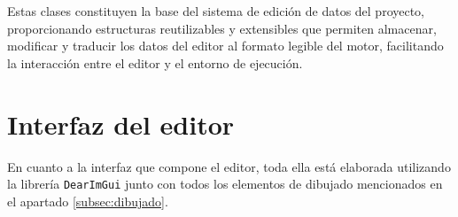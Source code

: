 Estas clases constituyen la base del sistema de edición de datos del proyecto, proporcionando estructuras reutilizables y extensibles que permiten almacenar, modificar y traducir los datos del editor al formato legible del motor, facilitando la interacción entre el editor y el entorno de ejecución.

\section{Interfaz del editor}
En cuanto a la interfaz que compone el editor, toda ella está elaborada utilizando la librería \texttt{DearImGui} junto con todos los elementos de dibujado mencionados en el apartado \ref{subsec:dibujado}. 


